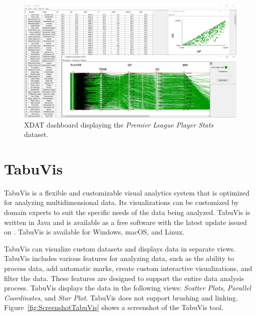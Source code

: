 \begin{figure}[tp]
\centering
\includegraphics[keepaspectratio,width=\linewidth,height=\halfh]
{images/screenshot-xdat.png}

\caption[XDAT Dashboard Screenshot]
{%
XDAT dashboard displaying the \emph{Premier League Player Stats} dataset.
}
\label{fig:ScreenshotXDAT}
\end{figure}



\section{TabuVis}

TabuVis \parencite{nguyen2013tabuvis} is a flexible and customizable
visual analytics system that is optimized for analyzing multidimensional
data. Its visualizations can be customized by domain experts to suit the
specific needs of the data being analyzed. TabuVis is written in Java and
is available as a free software with the latest update issued on
. TabuVis is available for Windows, macOS, and
Linux.

TabuVis can visualize custom datasets and displays data in separate views.
TabuVis includes various features for analyzing data, such as the ability
to process data, add automatic marks, create custom interactive
visualizations, and filter the data. These features are designed to
support the entire data analysis process. TabuVis displays the data in the
following views: \emph{Scatter Plots}, \emph{Parallel Coordinates}, and
\emph{Star Plot}. TabuVis does not support brushing and linking.
Figure~\ref{fig:ScreenshotTabuVis} shows a screenshot of the TabuVis tool.




